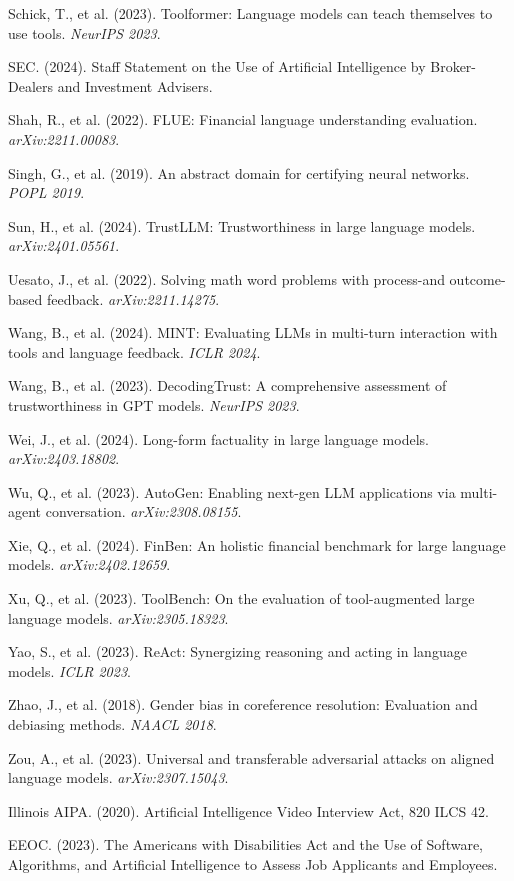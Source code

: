 \documentclass[
]{article}
\begin{document}
Schick, T., et al. (2023). Toolformer: Language models can teach themselves to use tools. \emph{NeurIPS 2023}.

SEC. (2024). Staff Statement on the Use of Artificial Intelligence by Broker-Dealers and Investment Advisers.

Shah, R., et al. (2022). FLUE: Financial language understanding evaluation. \emph{arXiv:2211.00083}.

Singh, G., et al. (2019). An abstract domain for certifying neural networks. \emph{POPL 2019}.

Sun, H., et al. (2024). TrustLLM: Trustworthiness in large language models. \emph{arXiv:2401.05561}.

Uesato, J., et al. (2022). Solving math word problems with process-and outcome-based feedback. \emph{arXiv:2211.14275}.

Wang, B., et al. (2024). MINT: Evaluating LLMs in multi-turn interaction with tools and language feedback. \emph{ICLR 2024}.

Wang, B., et al. (2023). DecodingTrust: A comprehensive assessment of trustworthiness in GPT models. \emph{NeurIPS 2023}.

Wei, J., et al. (2024). Long-form factuality in large language models. \emph{arXiv:2403.18802}.

Wu, Q., et al. (2023). AutoGen: Enabling next-gen LLM applications via multi-agent conversation. \emph{arXiv:2308.08155}.

Xie, Q., et al. (2024). FinBen: An holistic financial benchmark for large language models. \emph{arXiv:2402.12659}.

Xu, Q., et al. (2023). ToolBench: On the evaluation of tool-augmented large language models. \emph{arXiv:2305.18323}.

Yao, S., et al. (2023). ReAct: Synergizing reasoning and acting in language models. \emph{ICLR 2023}.

Zhao, J., et al. (2018). Gender bias in coreference resolution: Evaluation and debiasing methods. \emph{NAACL 2018}.

Zou, A., et al. (2023). Universal and transferable adversarial attacks on aligned language models. \emph{arXiv:2307.15043}.

Illinois AIPA. (2020). Artificial Intelligence Video Interview Act, 820 ILCS 42.

EEOC. (2023). The Americans with Disabilities Act and the Use of Software, Algorithms, and Artificial Intelligence to Assess Job Applicants and Employees.
\end{document}
